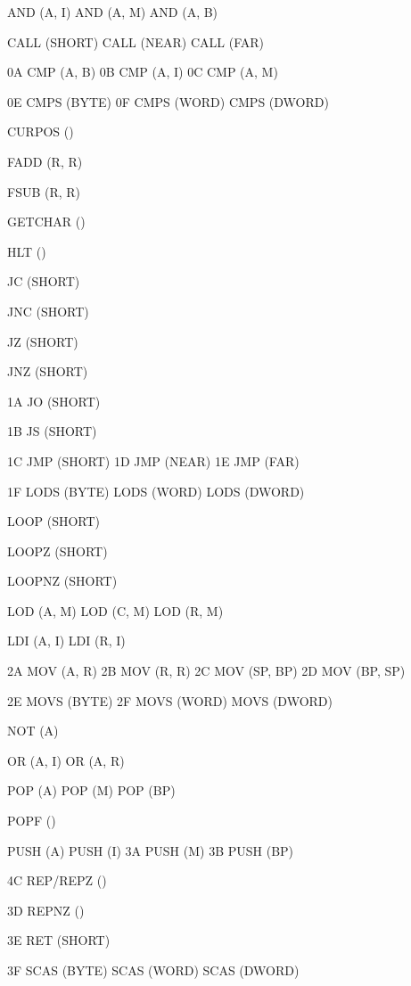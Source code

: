  AND (A, I)
 AND (A, M)
 AND (A, B)

 CALL (SHORT)
 CALL (NEAR)
 CALL (FAR)

\entry 0A CMP (A, B)
\entry 0B CMP (A, I)
\entry 0C CMP (A, M)

\entry 0E CMPS (BYTE)
\entry 0F CMPS (WORD)
 CMPS (DWORD)

 CURPOS ()

 FADD (R, R)

 FSUB (R, R)

 GETCHAR ()

 HLT ()

 JC (SHORT)

 JNC (SHORT)

 JZ (SHORT)

 JNZ (SHORT)

\entry 1A JO (SHORT)

\entry 1B JS (SHORT)

\entry 1C JMP (SHORT)
\entry 1D JMP (NEAR)
\entry 1E JMP (FAR)

\entry 1F LODS (BYTE)
 LODS (WORD)
 LODS (DWORD)

 LOOP (SHORT)

 LOOPZ (SHORT)

 LOOPNZ (SHORT)

 LOD (A, M)
 LOD (C, M)
 LOD (R, M)

 LDI (A, I)
 LDI (R, I)

\entry 2A MOV (A, R)
\entry 2B MOV (R, R)
\entry 2C MOV (SP, BP)
\entry 2D MOV (BP, SP)

\entry 2E MOVS (BYTE)
\entry 2F MOVS (WORD)
 MOVS (DWORD)

 NOT (A)

 OR (A, I)
 OR (A, R)

 POP (A)
 POP (M)
 POP (BP)

 POPF ()

 PUSH (A)
 PUSH (I)
\entry 3A PUSH (M)
\entry 3B PUSH (BP)

\entry 4C REP/REPZ ()

\entry 3D REPNZ ()

\entry 3E RET (SHORT)

\entry 3F SCAS (BYTE)
 SCAS (WORD)
 SCAS (DWORD)

